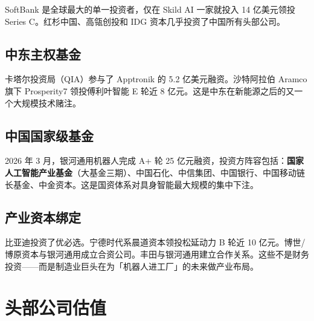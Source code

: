 SoftBank 是全球最大的单一投资者，仅在 Skild AI 一家就投入 14 亿美元领投 Series C\cite{skild2026seriesc}。红杉中国、高瓴创投和 IDG 资本几乎投资了中国所有头部公司。

\subsection{中东主权基金}

卡塔尔投资局（QIA）参与了 Apptronik 的 5.2 亿美元融资\cite{apptronik2026}。沙特阿拉伯 Aramco 旗下 Prosperity7 领投傅利叶智能 E 轮近 8 亿元\cite{fourier2025erround}。这是中东在新能源之后的又一个大规模技术赌注。

\subsection{中国国家级基金}

\begin{keybox}[国资入场信号]
2026 年 3 月，银河通用机器人完成 A+ 轮 25 亿元融资，投资方阵容包括：\textbf{国家人工智能产业基金}（大基金三期）、中国石化、中信集团、中国银行、中国移动链长基金、中金资本\cite{galbot2026aplus}。这是国资体系对具身智能最大规模的集中下注。
\end{keybox}

\subsection{产业资本绑定}

比亚迪投资了优必选\cite{ubtech2025byd}。宁德时代系晨道资本领投松延动力 B 轮近 10 亿元\cite{songyan2026b}。博世/博原资本与银河通用成立合资公司\cite{galbot2025bosch}。丰田与银河通用建立合作关系。这些不是财务投资——而是制造业巨头在为「机器人进工厂」的未来做产业布局。

\section{头部公司估值}

